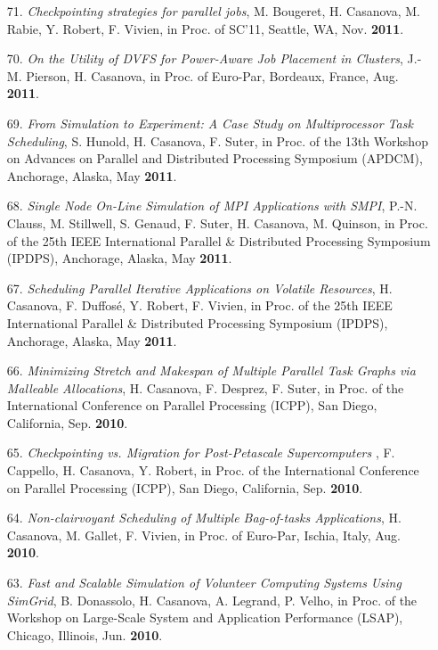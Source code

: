 \begin{enumerate}
\item[71.] {\it Checkpointing strategies for parallel jobs}, M.
Bougeret, H. Casanova, M. Rabie, Y. Robert, F. Vivien, in Proc.
of SC'11, Seattle, WA, Nov. {\bf 2011}.


\item[70.] {\it On the Utility of DVFS for Power-Aware Job Placement
in Clusters}, J.-M. Pierson, H. Casanova, in Proc. of Euro-Par,
Bordeaux, France, Aug. {\bf 2011}.


\item[69.] {\it From Simulation to Experiment: A Case Study on
Multiprocessor Task Scheduling}, S. Hunold, H. Casanova, F. Suter, in
Proc. of the 13th Workshop on Advances on Parallel and
Distributed Processing Symposium (APDCM), Anchorage, Alaska,
May {\bf 2011}.

\item[68.] {\it Single Node On-Line Simulation of MPI Applications
with SMPI}, P.-N. Clauss, M. Stillwell, S. Genaud, F. Suter, H.
Casanova, M. Quinson, in Proc. of the 25th  IEEE International
Parallel \& Distributed Processing Symposium (IPDPS), Anchorage,
Alaska, May {\bf 2011}.

\item[67.] {\it Scheduling Parallel Iterative Applications on Volatile
Resources}, H. Casanova, F. Duffos\'e, Y. Robert, F. Vivien, in
Proc. of the 25th  IEEE International Parallel \& Distributed
Processing Symposium (IPDPS), Anchorage, Alaska, May {\bf 2011}.

\item[66.] {\it Minimizing Stretch and Makespan of Multiple Parallel Task Graphs via Malleable Allocations},  H. Casanova, F. Desprez, F. Suter, 
in Proc. of the International
Conference on Parallel Processing (ICPP), San Diego, California, Sep.
{\bf 2010}. 

\item[65.] {\it Checkpointing vs. Migration for Post-Petascale Supercomputers
}, F. Cappello, H. Casanova, Y. Robert, 
in Proc. of the International
Conference on Parallel Processing (ICPP), San Diego, California, Sep.
{\bf 2010}. 



\item[64.] {\it Non-clairvoyant Scheduling of Multiple Bag-of-tasks
Applications}, H. Casanova, M. Gallet, F. Vivien, in Proc. of  Euro-Par,
Ischia, Italy, Aug. {\bf 2010}.


\item[63.] {\it Fast and Scalable Simulation of Volunteer Computing
Systems Using SimGrid}, B. Donassolo, H. Casanova, A. Legrand, P.
Velho, in Proc. of the Workshop on Large-Scale System and
Application Performance (LSAP), Chicago, Illinois, Jun. {\bf 2010}.


\end{enumerate}

